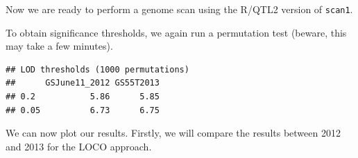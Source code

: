 \documentclass[
]{book}
\newenvironment{Shaded}{\begin{snugshade}}{\end{snugshade}}
\newcommand{\AttributeTok}[1]{\textcolor[rgb]{0.77,0.63,0.00}{#1}}
\newcommand{\CommentTok}[1]{\textcolor[rgb]{0.56,0.35,0.01}{\textit{#1}}}
\newcommand{\DecValTok}[1]{\textcolor[rgb]{0.00,0.00,0.81}{#1}}
\newcommand{\FloatTok}[1]{\textcolor[rgb]{0.00,0.00,0.81}{#1}}
\newcommand{\FunctionTok}[1]{\textcolor[rgb]{0.00,0.00,0.00}{#1}}
\newcommand{\NormalTok}[1]{#1}
\newcommand{\OtherTok}[1]{\textcolor[rgb]{0.56,0.35,0.01}{#1}}
\newcommand{\SpecialCharTok}[1]{\textcolor[rgb]{0.00,0.00,0.00}{#1}}
\begin{document}
Now we are ready to perform a genome scan using the R/QTL2 version of \texttt{scan1}.

\begin{Shaded}
\end{Shaded}

To obtain significance thresholds, we again run a permutation test (beware, this may take a few minutes).

\begin{Shaded}
\end{Shaded}

\begin{verbatim}
## LOD thresholds (1000 permutations)
##      GSJune11_2012 GS55T2013
## 0.2           5.86      5.85
## 0.05          6.73      6.75
\end{verbatim}

We can now plot our results. Firstly, we will compare the results between 2012 and 2013 for the LOCO approach.
\end{document}

